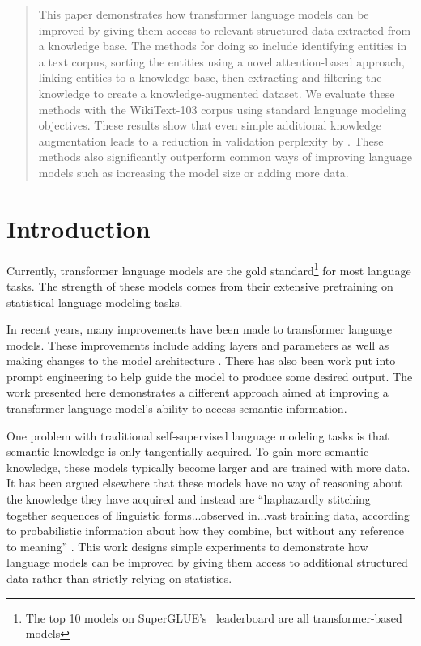 \documentclass[phd,electronic,oneside,twosidetoc,letterpaper,chaptercenter,parttop,lof]{byumsphd}
\begin{document}
\begin{abstract}
This paper demonstrates how transformer language models can be improved by giving them access to relevant structured data extracted from a knowledge base. 
The methods for doing so include identifying entities in a text corpus, sorting the entities using a novel attention-based approach, linking entities to a knowledge base, then extracting and filtering the knowledge to create a knowledge-augmented dataset.
We evaluate these methods with the WikiText-103 corpus using standard language modeling objectives.
These results show that even simple additional knowledge augmentation leads to a reduction in validation perplexity by \LMLossPercentageDecrease. 
These methods also significantly outperform common ways of improving language models such as increasing the model size or adding more data.
\end{abstract}


\section{Introduction}
Currently, transformer language models are the gold standard\footnote{The top 10 models on SuperGLUE's~\cite{wang2019superglue} leaderboard are all transformer-based models} for most language tasks.
The strength of these models comes from their extensive pretraining on statistical language modeling tasks.

In recent years, many improvements have been made to transformer language models.
These improvements include adding layers and parameters \cite{brown2020language} as well as making changes to the model architecture \cite{devlin2018bert}.
There has also been work put into prompt engineering \cite{zhang2021differentiable} to help guide the model to produce some desired output.
The work presented here demonstrates a different approach aimed at improving a transformer language model's ability to access semantic information.

One problem with traditional self-supervised language modeling tasks is that semantic knowledge is only tangentially acquired.
To gain more semantic knowledge, these models typically become larger and are trained with more data.
It has been argued elsewhere that these models have no way of reasoning about the knowledge they have acquired and instead are ``haphazardly stitching together sequences of linguistic forms...observed in...vast training data, according to probabilistic information about how they combine, but without any reference to meaning'' \cite{bender2021dangers}.
This work designs simple experiments to demonstrate how language models can be improved by giving them access to additional structured data rather than strictly relying on statistics.
\end{document}
